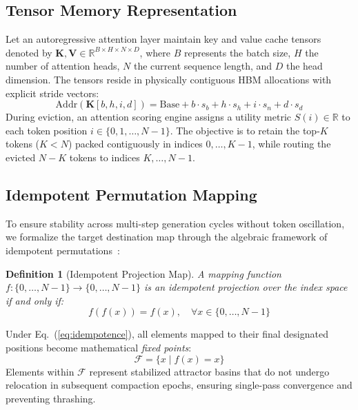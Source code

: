 \documentclass[journal,10pt,twocolumn]{article}
\newtheorem{definition}{Definition}
\begin{document}
\subsection{Tensor Memory Representation}
Let an autoregressive attention layer maintain key and value cache tensors denoted by $\mathbf{K}, \mathbf{V} \in \mathbb{R}^{B \times H \times N \times D}$, where $B$ represents the batch size, $H$ the number of attention heads, $N$ the current sequence length, and $D$ the head dimension. The tensors reside in physically contiguous HBM allocations with explicit stride vectors:
\begin{equation}
    \text{Addr}(\mathbf{K}[b, h, i, d]) = \text{Base} + b \cdot s_{b} + h \cdot s_{h} + i \cdot s_{n} + d \cdot s_{d}
\end{equation}
During eviction, an attention scoring engine assigns a utility metric $S(i) \in \mathbb{R}$ to each token position $i \in \{0, 1, \dots, N-1\}$. The objective is to retain the top-$K$ tokens ($K < N$) packed contiguously in indices $0, \dots, K-1$, while routing the evicted $N-K$ tokens to indices $K, \dots, N-1$.

\subsection{Idempotent Permutation Mapping}
To ensure stability across multi-step generation cycles without token oscillation, we formalize the target destination map through the algebraic framework of idempotent permutations~\cite{cetin2013idempotent}:
\begin{definition}[Idempotent Projection Map]
A mapping function $f: \{0, \dots, N-1\} \to \{0, \dots, N-1\}$ is an idempotent projection over the index space if and only if:
\begin{equation}
    f(f(x)) = f(x), \quad \forall x \in \{0, \dots, N-1\}
    \label{eq:idempotence}
\end{equation}
\end{definition}
Under Eq.~(\ref{eq:idempotence}), all elements mapped to their final designated positions become mathematical \textit{fixed points}:
\begin{equation}
    \mathcal{F} = \{x \mid f(x) = x\}
\end{equation}
Elements within $\mathcal{F}$ represent stabilized attractor basins that do not undergo relocation in subsequent compaction epochs, ensuring single-pass convergence and preventing thrashing.
\end{document}
